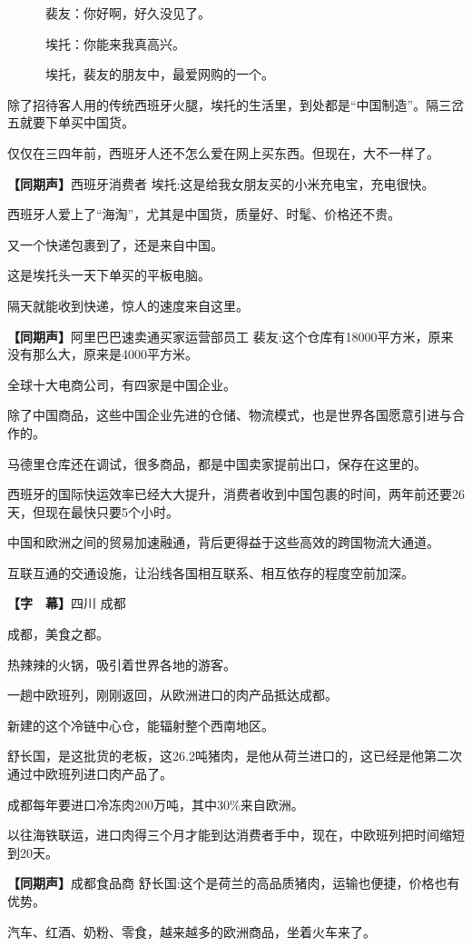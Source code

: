 \documentclass{ctexart}
\newcommand{\zkh}[1]{\textbf{\hspace{-2.7em} 【#1】}}
\begin{document}
　　　裴友：你好啊，好久没见了。

　　　埃托：你能来我真高兴。

　　　埃托，裴友的朋友中，最爱网购的一个。

除了招待客人用的传统西班牙火腿，埃托的生活里，到处都是``中国制造''。隔三岔五就要下单买中国货。

仅仅在三四年前，西班牙人还不怎么爱在网上买东西。但现在，大不一样了。

\zkh{同期声}西班牙消费者 埃托:这是给我女朋友买的小米充电宝，充电很快。

西班牙人爱上了``海淘''，尤其是中国货，质量好、时髦、价格还不贵。

又一个快递包裹到了，还是来自中国。

这是埃托头一天下单买的平板电脑。

隔天就能收到快递，惊人的速度来自这里。

\zkh{同期声}阿里巴巴速卖通买家运营部员工 裴友:这个仓库有18000平方米，原来没有那么大，原来是4000平方米。

全球十大电商公司，有四家是中国企业。

除了中国商品，这些中国企业先进的仓储、物流模式，也是世界各国愿意引进与合作的。

马德里仓库还在调试，很多商品，都是中国卖家提前出口，保存在这里的。

西班牙的国际快运效率已经大大提升，消费者收到中国包裹的时间，两年前还要26天，但现在最快只要5个小时。

中国和欧洲之间的贸易加速融通，背后更得益于这些高效的跨国物流大通道。

互联互通的交通设施，让沿线各国相互联系、相互依存的程度空前加深。

\zkh{字　幕}四川 成都

成都，美食之都。

热辣辣的火锅，吸引着世界各地的游客。

一趟中欧班列，刚刚返回，从欧洲进口的肉产品抵达成都。

新建的这个冷链中心仓，能辐射整个西南地区。

舒长国，是这批货的老板，这26.2吨猪肉，是他从荷兰进口的，这已经是他第二次通过中欧班列进口肉产品了。

成都每年要进口冷冻肉200万吨，其中30{\%}来自欧洲。

以往海铁联运，进口肉得三个月才能到达消费者手中，现在，中欧班列把时间缩短到20天。

\zkh{同期声}成都食品商 舒长国:这个是荷兰的高品质猪肉，运输也便捷，价格也有优势。

汽车、红酒、奶粉、零食，越来越多的欧洲商品，坐着火车来了。
\end{document}

